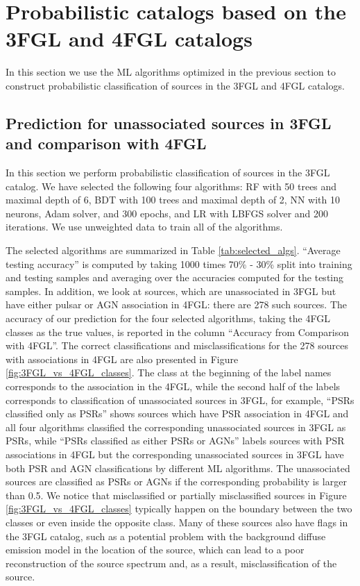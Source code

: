 \section{Probabilistic catalogs based on the 3FGL and 4FGL catalogs}

In this section we use the ML algorithms optimized in the previous section to construct probabilistic
classification of sources in the 3FGL and 4FGL catalogs.


\subsection{Prediction for unassociated sources in 3FGL and comparison with 4FGL}


In this section we perform probabilistic classification of sources in the 3FGL catalog.
We have selected the following four algorithms: RF with 50 trees and maximal depth of 6, BDT with 100 trees and maximal depth of 2, NN with 10 neurons, Adam solver, and 300 epochs, and LR with LBFGS solver and 200 iterations. We use unweighted data to train all of the algorithms.

The selected algorithms are summarized in Table \ref{tab:selected_algs}.
``Average testing accuracy'' is computed by taking 1000 times 70\% - 30\% split into training and testing samples and averaging over the 
accuracies computed for the testing samples.
In addition, we look at sources, which are unassociated in 3FGL but have either pulsar or AGN association in 4FGL: there are 278 such sources.
The accuracy of our prediction for the four selected algorithms, taking the 4FGL classes as the true values, is reported in the column ``Accuracy from Comparison with 4FGL''.
The correct classifications and misclassifications for the 278 sources with associations in 4FGL are also presented in Figure \ref{fig:3FGL_vs_4FGL_classes}.
The class at the beginning of the label names corresponds to the association in the 4FGL, while the second half of the labels corresponds to classification of unassociated sources in 3FGL, for example, ``PSRs classified only as PSRs'' shows sources which have PSR association in 4FGL and all four algorithms classified the corresponding unassociated sources in 3FGL as PSRs, while ``PSRs classified as either PSRs or AGNs'' labels sources with PSR associations in 4FGL but the corresponding unassociated sources in 3FGL have both PSR and AGN classifications by different ML algorithms.
The unassociated sources are classified as PSRs or AGNs if the corresponding probability is larger than 0.5.
We notice that misclassified or partially misclassified sources in Figure \ref{fig:3FGL_vs_4FGL_classes} typically happen on the boundary between the two classes or even inside the opposite class.
Many of these sources also have flags in the 3FGL catalog, such as a potential problem with the background diffuse emission model in the location of the source, which can lead to a poor reconstruction of the source spectrum and, as a result, misclassification of the source.

